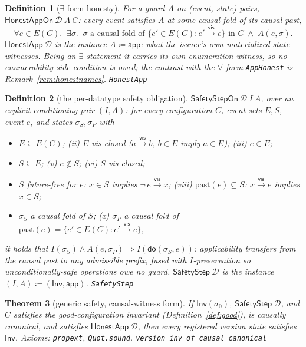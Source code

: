 \documentclass[11pt]{article}
\newtheorem{theorem}{Theorem}[section]
\newtheorem{definition}[theorem]{Definition}
\newcommand{\vis}{\xrightarrow{\mathsf{vis}}}
\newcommand{\Sinit}{\sigma_0}
\newcommand{\lean}[1]{\texttt{#1}}
\newcommand{\M}[1]{\mathcal{#1}}
\newcommand{\dodo}{\mathsf{do}}
\newcommand{\Inv}{\mathsf{Inv}}
\newcommand{\app}{\mathsf{app}}
\begin{document}
\begin{definition}[$\exists$-form honesty]
\label{def:honestapp}
For a guard $A$ on (event, state) pairs, $\mathsf{HonestAppOn}\ \M{D}\ A\ C$: every
event satisfies $A$ at \emph{some} causal fold of its causal past,
\[
  \forall e \in E(C).\;\; \exists \sigma.\;\;
  \sigma \text{ a causal fold of } \{e' \in E(C) : e' \vis e\} \text{ in } C
  \;\wedge\; A(e, \sigma) .
\]
$\mathsf{HonestApp}\ \M{D}$ is the instance $A \coloneqq \app$: what the issuer's own
materialized state witnesses. Being an $\exists$-statement it carries its own
enumeration witness, so no enumerability side condition is owed; the contrast with the
$\forall$-form \lean{AppHonest} is Remark~\ref{rem:honestnames}.
\hfill\lean{HonestApp}
\end{definition}

\begin{definition}[the per-datatype safety obligation]
\label{def:safetystep}
$\mathsf{SafetyStepOn}\ \M{D}\ I\ A$, over an explicit conditioning pair $(I, A)$:
for every configuration $C$, event sets $E, S$, event $e$, and states
$\sigma_S, \sigma_P$ with
\begin{itemize}[leftmargin=2.2em]
\item[(i)] $E \subseteq E(C)$; \quad (ii) $E$ vis-closed ($a \vis b$, $b \in E$
  imply $a \in E$); \quad (iii) $e \in E$;
\item[(iv)] $S \subseteq E$; \quad (v) $e \notin S$; \quad (vi) $S$ vis-closed;
\item[(vii)] $S$ future-free for $e$: $x \in S$ implies $\neg\, e \vis x$; \quad
  (viii) $\mathrm{past}(e) \subseteq S$: $x \vis e$ implies $x \in S$;
\item[(ix)] $\sigma_S$ a causal fold of $S$; \quad (x) $\sigma_P$ a causal fold of
  $\mathrm{past}(e) = \{e' \in E(C) : e' \vis e\}$,
\end{itemize}
it holds that $I(\sigma_S) \wedge A(e, \sigma_P) \Rightarrow
I(\dodo(\sigma_S, e))$: applicability transfers from the causal past to any
admissible prefix, fused with $I$-preservation so unconditionally-safe operations owe
no guard. $\mathsf{SafetyStep}\ \M{D}$ is the instance $(I, A) \coloneqq
(\Inv, \app)$.
\hfill\lean{SafetyStep}
\end{definition}

\begin{theorem}[generic safety, causal-witness form]
\label{thm:gensafety}
If $\Inv(\Sinit)$, $\mathsf{SafetyStep}\ \M{D}$, and $C$ satisfies the
good-configuration invariant (Definition~\ref{def:good}), is causally canonical, and
satisfies $\mathsf{HonestApp}\ \M{D}$, then every registered version state satisfies
$\Inv$. Axioms: \lean{propext}, \lean{Quot.sound}.
\hfill\lean{version\_inv\_of\_causal\_canonical}
\end{theorem}
\end{document}
